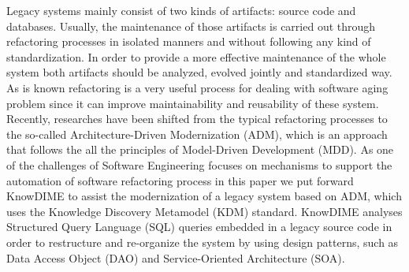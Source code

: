 Legacy systems mainly consist of two kinds of artifacts: source code and databases. Usually, the maintenance of those artifacts is carried out through refactoring processes in isolated manners and without following any kind of standardization. In order to provide a more effective maintenance of the whole system both artifacts should be analyzed, evolved jointly and standardized way. As is known refactoring is a very useful process for dealing with software aging problem since it can improve maintainability and reusability of these system. Recently, researches have been shifted from the typical refactoring processes to the so-called Architecture-Driven Modernization (ADM), which is an approach that follows the all the principles of Model-Driven Development (MDD). As one of the challenges of Software Engineering focuses on mechanisms to support the automation of software refactoring process in this paper we put forward KnowDIME to assist the modernization of a legacy system based on ADM, which uses the Knowledge Discovery Metamodel (KDM) standard. KnowDIME analyses Structured Query Language (SQL) queries embedded in a legacy source code in order to restructure and re-organize the system by using design patterns, such as Data Access Object (DAO) and Service-Oriented Architecture (SOA). 
